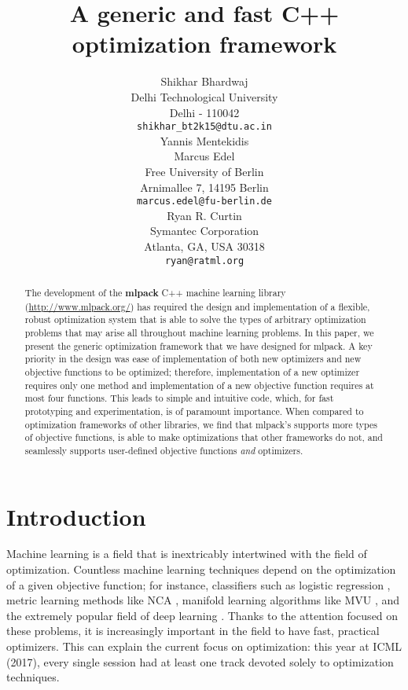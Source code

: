 \documentclass{article}
\title{A generic and fast C++ optimization framework}
\author{
  Shikhar Bhardwaj \\
  Delhi Technological University \\
  Delhi - 110042 \\
  \texttt{shikhar_bt2k15@dtu.ac.in} \\
  \AND
  Yannis Mentekidis \\
  \AND
  Marcus Edel \\
  Free University of Berlin \\
  Arnimallee 7, 14195 Berlin \\
  \texttt{marcus.edel@fu-berlin.de} \\
  \AND
  Ryan R. Curtin \\
  Symantec Corporation \\
  Atlanta, GA, USA 30318 \\
  \texttt{ryan@ratml.org} \\
}
\begin{document}

\maketitle

\begin{abstract}
The development of the {\bf mlpack} C++ machine learning library
(\url{http://www.mlpack.org/}) has required the design and implementation of a
flexible, robust optimization system that is able to solve the types of
arbitrary optimization problems that may arise all throughout machine learning
problems.  In this paper, we present the generic optimization framework that we
have designed for mlpack.  A key priority in the design was ease of
implementation of both new optimizers and new objective functions to be
optimized; therefore, implementation of a new optimizer requires only one
method and implementation of a new objective function requires at most four
functions.  This leads to simple and intuitive code, which, for fast prototyping
and experimentation, is of paramount importance.  When compared to
optimization frameworks of other libraries, we find that mlpack's supports more
types of objective functions, is able to make optimizations that other
frameworks do not, and seamlessly supports user-defined objective functions
{\it and} optimizers.
%
\end{abstract}

\section{Introduction}

Machine learning is a field that is inextricably intertwined with the field of
optimization.  Countless machine learning techniques depend on the optimization
of a given objective function; for instance, classifiers such as logistic
regression \cite{cox1958regression}, metric learning methods like NCA
\cite{goldberger2005neighbourhood}, manifold learning algorithms like MVU
\cite{weinberger2006introduction}, and the extremely popular field of deep
learning \cite{schmidhuber2015deep}.  Thanks to the attention focused on these
problems, it is increasingly important in the field to have fast, practical
optimizers.  This can explain the current focus on optimization: this year at
ICML (2017), every single session had at least one track devoted solely to
optimization techniques.
\end{document}
